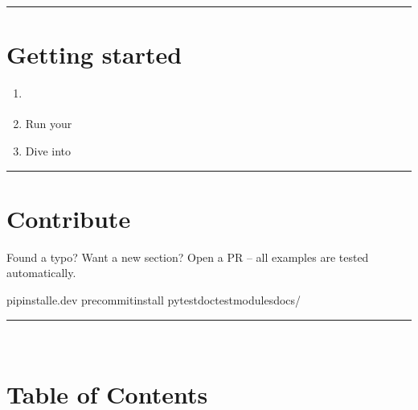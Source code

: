 \documentclass[a4paper,11pt,english]{sphinxmanual}
\begin{document}
\bigskip\hrule\bigskip



\chapter{Getting started}
\label{\detokenize{index:getting-started}}\begin{enumerate}
%
\item {} 
\sphinxAtStartPar
{\hyperref[\detokenize{getting_started/installation::doc}]{}}

\item {} 
\sphinxAtStartPar
Run your {\hyperref[\detokenize{getting_started/first_program::doc}]{}}

\item {} 
\sphinxAtStartPar
Dive into {\hyperref[\detokenize{core_language/syntax_basic_types::doc}]{}}

\end{enumerate}


\bigskip\hrule\bigskip



\chapter{Contribute}
\label{\detokenize{index:contribute}}
\sphinxAtStartPar
Found a typo? Want a new section? Open a PR – all examples are tested automatically.

\begin{sphinxVerbatim}[commandchars=\\\{\}]
pipinstall\PYGZhy{}e.\PYG{o}{[}dev\PYG{o}{]}
pre\PYGZhy{}commitinstall
pytest\PYGZhy{}\PYGZhy{}doctest\PYGZhy{}modulesdocs/
\end{sphinxVerbatim}


\bigskip\hrule\bigskip


\sphinxAtStartPar
{} 🚀


\chapter{Table of Contents}
\label{\detokenize{index:table-of-contents}}
\sphinxstepscope
\end{document}
